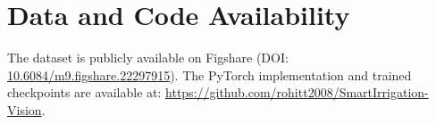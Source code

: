 \documentclass[conference]{IEEEtran}
\begin{document}
\section*{Data and Code Availability}
The dataset is publicly available on Figshare (DOI: \url{10.6084/m9.figshare.22297915}). The PyTorch implementation and trained checkpoints are available at: \url{https://github.com/rohitt2008/SmartIrrigation-Vision}.



\end{document}
